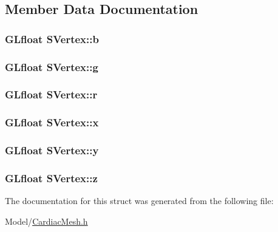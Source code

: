 \subsection{Member Data Documentation}
\hypertarget{struct_s_vertex_a27979f0b7a77327a31d2525007300e91}{
\subsubsection[{b}]{\setlength{\rightskip}{0pt plus 5cm}G\+Lfloat S\+Vertex\+::b}}\label{struct_s_vertex_a27979f0b7a77327a31d2525007300e91}
\hypertarget{struct_s_vertex_a45e2a28d0e25827f9267a77a6ae47fcb}{
\subsubsection[{g}]{\setlength{\rightskip}{0pt plus 5cm}G\+Lfloat S\+Vertex\+::g}}\label{struct_s_vertex_a45e2a28d0e25827f9267a77a6ae47fcb}
\hypertarget{struct_s_vertex_a569fbf3b7596904acf89120c18508ba7}{
\subsubsection[{r}]{\setlength{\rightskip}{0pt plus 5cm}G\+Lfloat S\+Vertex\+::r}}\label{struct_s_vertex_a569fbf3b7596904acf89120c18508ba7}
\hypertarget{struct_s_vertex_a5f1f1d9f65da1828f1f5228f036a1e7b}{
\subsubsection[{x}]{\setlength{\rightskip}{0pt plus 5cm}G\+Lfloat S\+Vertex\+::x}}\label{struct_s_vertex_a5f1f1d9f65da1828f1f5228f036a1e7b}
\hypertarget{struct_s_vertex_a032f82bfe624055abca2c89f7f073080}{
\subsubsection[{y}]{\setlength{\rightskip}{0pt plus 5cm}G\+Lfloat S\+Vertex\+::y}}\label{struct_s_vertex_a032f82bfe624055abca2c89f7f073080}
\hypertarget{struct_s_vertex_a52b7560faaa70a1e61b8221135e50d63}{
\subsubsection[{z}]{\setlength{\rightskip}{0pt plus 5cm}G\+Lfloat S\+Vertex\+::z}}\label{struct_s_vertex_a52b7560faaa70a1e61b8221135e50d63}


The documentation for this struct was generated from the following file\+:\begin{DoxyCompactItemize}
\item 
Model/\hyperlink{_cardiac_mesh_8h}{Cardiac\+Mesh.\+h}\end{DoxyCompactItemize}
